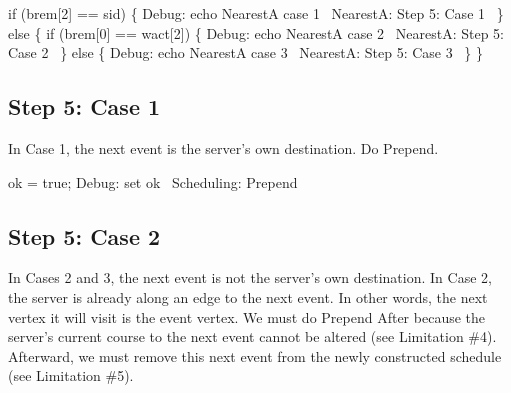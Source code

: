 \nwenddocs{}\endmoddef\nwstartdeflinemarkup{}\nwenddeflinemarkup
if (brem[2] == sid) \{
  \LA{}Debug: echo NearestA case 1~{\nwtagstyle{}}\RA{}
  \LA{}NearestA: Step 5: Case 1~{\nwtagstyle{}}\RA{}
\} else \{
  if (brem[0] == wact[2]) \{
    \LA{}Debug: echo NearestA case 2~{\nwtagstyle{}}\RA{}
    \LA{}NearestA: Step 5: Case 2~{\nwtagstyle{}}\RA{}
  \} else \{
    \LA{}Debug: echo NearestA case 3~{\nwtagstyle{}}\RA{}
    \LA{}NearestA: Step 5: Case 3~{\nwtagstyle{}}\RA{}
  \}
\}
\nwendcode{}\nwdocspar

\subsection{Step 5: Case 1}

In Case 1, the next event is the server's own destination. Do Prepend.

\nwenddocs{}\endmoddef\nwstartdeflinemarkup{}\nwenddeflinemarkup
ok = true;
\LA{}Debug: set ok~{\nwtagstyle{}}\RA{}
\LA{}Scheduling: Prepend~{\nwtagstyle{}}\RA{}
\nwendcode{}\nwdocspar

\subsection{Step 5: Case 2}

In Cases 2 and 3, the next event is not the server's own destination. In Case
2, the server is already along an edge to the next event. In other words, the
next vertex it will visit is the event vertex. We must do Prepend After because
the server's current course to the next event cannot be altered (see Limitation
\#4). Afterward, we must remove this next event from the newly constructed
schedule (see Limitation \#5).

